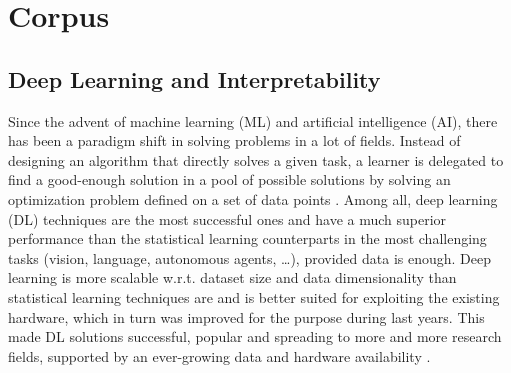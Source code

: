 \chapter{Corpus}
\label{c:corpus}


\section{Deep Learning and Interpretability}
Since the advent of machine learning (ML) and artificial intelligence (AI), there has been a paradigm shift in solving problems in a lot of fields.
Instead of designing an algorithm that directly solves a given task, a learner is delegated to find a good-enough solution in a pool of possible solutions by solving an optimization problem defined on a set of data points \cite{ML_book}.
Among all, deep learning (DL) techniques are the most successful ones and have a much superior performance than the statistical learning counterparts in the most challenging tasks (vision, language, autonomous agents, …), provided data is enough.
Deep learning is more scalable w.r.t. dataset size and data dimensionality than statistical learning techniques are and is better suited for exploiting the existing hardware, which in turn was improved for the purpose during last years.
This made DL solutions successful, popular and spreading to more and more research fields, supported by an ever-growing data and hardware availability \cite{DL_overview}.

